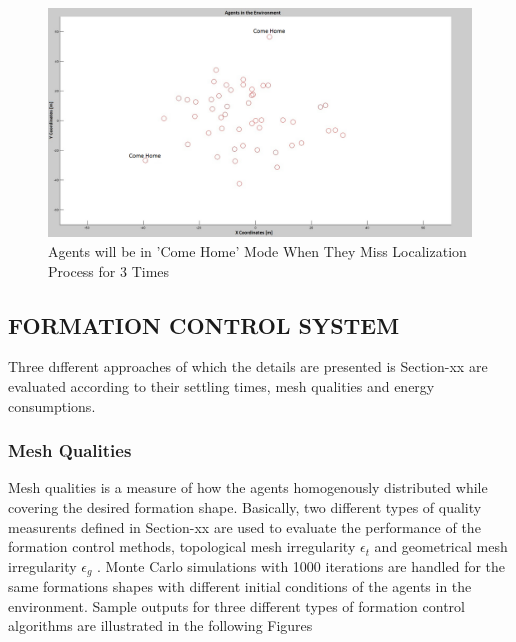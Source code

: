 \documentclass[twoside]{article}
\begin{document}
			\begin{figure}[H]
				\caption{Agents will be in 'Come Home' Mode When They Miss Localization Process for 3 Times}
				\centerline{\includegraphics[scale = 0.30]{Lost-2-3}}
			\end{figure} 		
		
		
		
		\subsection{FORMATION CONTROL SYSTEM}
  Three dıfferent approaches of which the details are presented is Section-xx are evaluated according to their settling times, mesh qualities and energy consumptions. 
  \subsubsection{Mesh Qualities} 
  Mesh qualities is a measure of how the agents homogenously distributed while covering the desired formation shape. Basically, two different types of quality measurents defined in Section-xx are used to evaluate the performance of the formation control methods, topological mesh irregularity $\epsilon_t$ and geometrical mesh irregularity $\epsilon_g$ . Monte Carlo simulations with 1000 iterations are handled for the same formations shapes with different initial conditions of the agents in the environment. Sample outputs for three different types of formation control algorithms are illustrated in the following Figures
  
		
		
\end{document}
